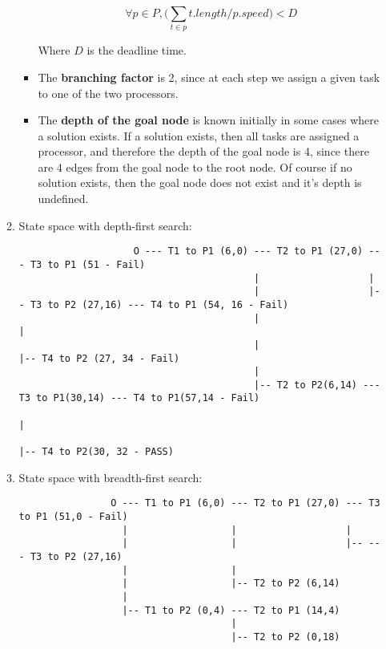 \documentclass{article}
\begin{document}
\begin{enumerate}
\begin{enumerate}
\begin{itemize}
					$$\forall p \in P, \bigg(\sum_{t \in p}t.length/p.speed\bigg) < D$$
					
					Where $D$ is the deadline time.
					
					\item The \textbf{branching factor} is 2, since at each step we assign a given task to one of the two processors.
					
					\item The \textbf{depth of the goal node} is known initially in some cases where a solution exists.  If a solution exists, then all tasks are assigned a processor, and therefore the depth of the goal node is 4, since there are 4 edges from the goal node to the root node.  Of course if no solution exists, then the goal node does not exist and it's depth is undefined.
				\end{itemize}
			
				\item State space with depth-first search:
				
				\begin{verbatim}
					O --- T1 to P1 (6,0) --- T2 to P1 (27,0) --- T3 to P1 (51 - Fail)
					                     |                   |
					                     |                   |-- T3 to P2 (27,16) --- T4 to P1 (54, 16 - Fail)
					                     |                                        |
					                     |                                        |-- T4 to P2 (27, 34 - Fail)
					                     |
					                     |-- T2 to P2(6,14) --- T3 to P1(30,14) --- T4 to P1(57,14 - Fail)
					                                                            |
					                                                            |-- T4 to P2(30, 32 - PASS)
				\end{verbatim}
				
				\item State space with breadth-first search:
				
				\begin{verbatim}
				O --- T1 to P1 (6,0) --- T2 to P1 (27,0) --- T3 to P1 (51,0 - Fail)
				  |                  |                   |
				  |                  |                   |-- --- T3 to P2 (27,16)
				  |                  |
				  |                  |-- T2 to P2 (6,14)
				  |
				  |-- T1 to P2 (0,4) --- T2 to P1 (14,4)
				                     |
				                     |-- T2 to P2 (0,18)
				\end{verbatim}
			\end{enumerate}
		
	\end{enumerate}
\end{document}
